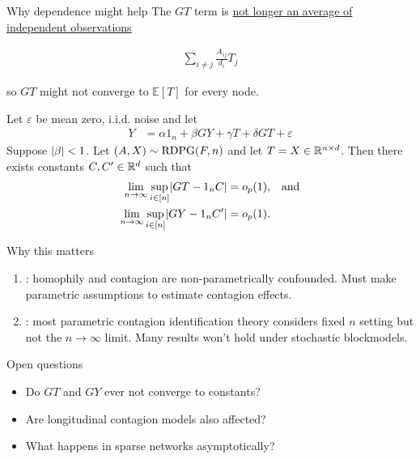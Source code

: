 \documentclass[aspectratio=169]{beamer}
\theoremstyle{remark}
\begin{document}
\begin{frame}{Why dependence might help}
    The $GT$ term is \underline{not longer an average of independent observations}
    
    \begin{align*}
        \sum_{i \neq j} \frac{A_{ij}}{d_i} T_j                 
    \end{align*}
    
    so $GT$ might not converge to $\mathbb E[T]$ for every node.
\end{frame}

\begin{frame}
    \begin{theorem}
        Let $\varepsilon$ be mean zero, i.i.d. noise and let
        \begin{align*}
            Y & = \alpha 1_n + \beta G Y + \gamma T + \delta G T + \varepsilon                        
        \end{align*}
        Suppose $\lvert\beta\rvert < 1$. Let $(A, X) \sim \text{RDPG}(F, n)$ and let $T = X \in \mathbb{R}^{n \times d}$. Then there exists constants $C, C' \in \mathbb{R}^d$ such that
        \begin{align*}
            \lim_{n \to \infty} \sup_{i \in [n]} \abs*{GT - 1_n C}  & = \op{1},  & \text{and} \\
            \lim_{n \to \infty} \sup_{i \in [n]} \abs*{GY - 1_n C'} & = \op{1}.
        \end{align*}
    \end{theorem}
\end{frame}

\begin{frame}{Why this matters}
    
    \begin{enumerate}
        \item \cite{shalizi2011,mcfowland2021}: homophily and contagion are non-parametrically confounded. Must make parametric assumptions to estimate contagion effects.
        \item \cite{bramoulle2020}: most parametric contagion identification theory considers fixed $n$ setting but not the $n \to \infty$ limit. Many results won't hold under stochastic blockmodels.
    \end{enumerate}
\end{frame}

\begin{frame}{Open questions}
    
    \begin{itemize}
        \item Do $GT$ and $GY$ ever not converge to constants?
        \item Are longitudinal contagion models also affected?
        \item What happens in sparse networks asymptotically?
    \end{itemize}
\end{frame}
\end{document}
